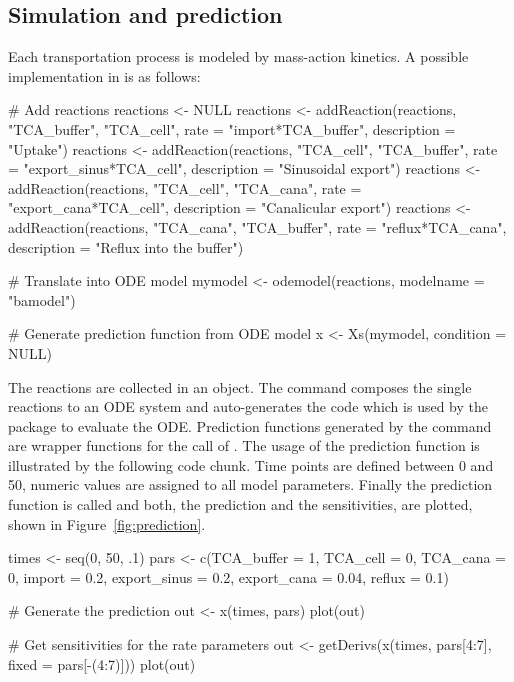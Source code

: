 \documentclass[article]{jss}
\begin{document}
\subsection{Simulation and prediction}

Each transportation process is modeled by mass-action kinetics. A possible implementation in  is as follows:
\begin{CodeChunk}
	\begin{CodeInput}
# Add reactions
reactions <- NULL
reactions <- addReaction(reactions, "TCA_buffer", "TCA_cell",
			 rate = "import*TCA_buffer",
			 description = "Uptake")
reactions <- addReaction(reactions, "TCA_cell", "TCA_buffer",
			 rate = "export_sinus*TCA_cell",
			 description = "Sinusoidal export")
reactions <- addReaction(reactions, "TCA_cell", "TCA_cana",
			 rate = "export_cana*TCA_cell",
			 description = "Canalicular export")
reactions <- addReaction(reactions, "TCA_cana", "TCA_buffer",
			 rate = "reflux*TCA_cana",
			 description = "Reflux into the buffer")

# Translate into ODE model
mymodel <- odemodel(reactions, modelname = "bamodel")

# Generate prediction function from ODE model
x <- Xs(mymodel, condition = NULL)
	\end{CodeInput}
\end{CodeChunk}
The reactions are collected in an  object. The  command composes the single reactions to an ODE system and auto-generates the  code which is used by the  package to evaluate the ODE. Prediction functions generated by the  command are wrapper functions for the call of . The usage of the prediction function is illustrated by the following code chunk. Time points are defined between 0 and 50, numeric values are assigned to all model parameters. Finally the prediction function is called and both, the prediction and the sensitivities, are plotted, shown in Figure~\ref{fig:prediction}.

\begin{CodeChunk}
\begin{CodeInput}
times <- seq(0, 50, .1)
pars <- c(TCA_buffer = 1,
          TCA_cell = 0,
	  TCA_cana = 0,
	  import = 0.2,
	  export_sinus = 0.2,
	  export_cana = 0.04,
	  reflux = 0.1)

# Generate the prediction
out <- x(times, pars)
plot(out)

# Get sensitivities for the rate parameters
out <- getDerivs(x(times, pars[4:7], fixed = pars[-(4:7)]))
plot(out)
\end{CodeInput}
\end{CodeChunk}
\end{document}
